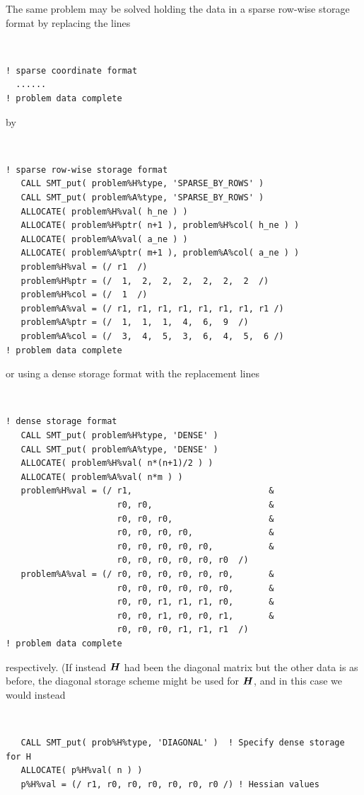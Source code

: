 \documentclass{galahad}
\begin{document}
\noindent
The same problem may be solved holding the data in
a sparse row-wise storage format by replacing the lines
{\tt \small
\begin{verbatim}
! sparse coordinate format
  ......
! problem data complete
\end{verbatim}
}
\noindent
by
{\tt \small
\begin{verbatim}
! sparse row-wise storage format
   CALL SMT_put( problem%H%type, 'SPARSE_BY_ROWS' )
   CALL SMT_put( problem%A%type, 'SPARSE_BY_ROWS' )
   ALLOCATE( problem%H%val( h_ne ) )
   ALLOCATE( problem%H%ptr( n+1 ), problem%H%col( h_ne ) )
   ALLOCATE( problem%A%val( a_ne ) )
   ALLOCATE( problem%A%ptr( m+1 ), problem%A%col( a_ne ) )
   problem%H%val = (/ r1  /)
   problem%H%ptr = (/  1,  2,  2,  2,  2,  2,  2  /)
   problem%H%col = (/  1  /)
   problem%A%val = (/ r1, r1, r1, r1, r1, r1, r1, r1 /)
   problem%A%ptr = (/  1,  1,  1,  4,  6,  9  /)
   problem%A%col = (/  3,  4,  5,  3,  6,  4,  5,  6 /)
! problem data complete
\end{verbatim}
}
\noindent
or using a dense storage format with the replacement lines
{\tt \small
\begin{verbatim}
! dense storage format
   CALL SMT_put( problem%H%type, 'DENSE' )
   CALL SMT_put( problem%A%type, 'DENSE' )
   ALLOCATE( problem%H%val( n*(n+1)/2 ) )
   ALLOCATE( problem%A%val( n*m ) )
   problem%H%val = (/ r1,                           &
                      r0, r0,                       &
                      r0, r0, r0,                   &
                      r0, r0, r0, r0,               &
                      r0, r0, r0, r0, r0,           &
                      r0, r0, r0, r0, r0, r0  /)
   problem%A%val = (/ r0, r0, r0, r0, r0, r0,       &
                      r0, r0, r0, r0, r0, r0,       &
                      r0, r0, r1, r1, r1, r0,       &
                      r0, r0, r1, r0, r0, r1,       &
                      r0, r0, r0, r1, r1, r1  /)
! problem data complete
\end{verbatim}
}
\noindent
respectively.
(If instead ${\bm{H}}$ had been the diagonal matrix
but the other data is as before, the diagonal storage scheme
might be used for ${\bm{H}}$, and in this case we would instead
{\tt \small
\begin{verbatim}
   CALL SMT_put( prob%H%type, 'DIAGONAL' )  ! Specify dense storage for H
   ALLOCATE( p%H%val( n ) )
   p%H%val = (/ r1, r0, r0, r0, r0, r0, r0 /) ! Hessian values
\end{verbatim}
}
\end{document}
